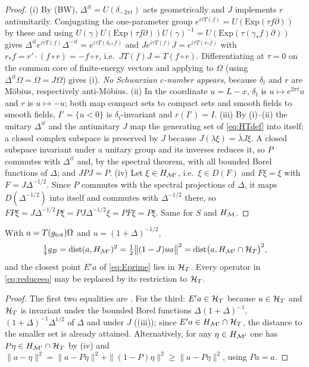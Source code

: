 \begin{proof}
(i) By (BW), $\Delta^{it}=U(\delta_{-2\pi t})$ acts geometrically and $J$ implements $r$ antiunitarily.
Conjugating the one-parameter group $e^{i\tau T(f)}=U(\mathrm{Exp}(\tau f\partial))$ by these and using
$U(\gamma)U(\mathrm{Exp}(\tau f\partial))U(\gamma)^{-1}=U(\mathrm{Exp}(\tau(\gamma_{*}f)\partial))$ gives
$\Delta^{it}e^{i\tau T(f)}\Delta^{-it}=e^{i\tau T(\delta_{t*}f)}$ and
$Je^{i\tau T(f)}J=e^{i\tau T(r_{*}f)}$ with $r_{*}f=r'\cdot(f\circ r)=-f\circ r$, i.e.\
$JT(f)J=T(f\circ r)$.  Differentiating at $\tau=0$ on the common core of finite-energy vectors and applying
to $\Omega$ (using $\Delta^{it}\Omega=\Omega=J\Omega$) gives (i).  \emph{No Schwarzian $c$-number appears},
because $\delta_{t}$ and $r$ are M\"obius, respectively anti-M\"obius.
(ii) In the coordinate $u=L-x$, $\delta_{t}$ is $u\mapsto e^{2\pi t}u$ and $r$ is $u\mapsto-u$; both map
compact sets to compact sets and smooth fields to smooth fields, $I'=\{u<0\}$ is $\delta_{t}$-invariant and
$r(I')=I$.
(iii) By (i)--(ii) the unitary $\Delta^{it}$ and the antiunitary $J$ map the generating set of \eqref{eq:HTdef}
into itself; a closed complex subspace is preserved by $J$ because $J(\lambda\xi)=\bar\lambda J\xi$.  A
closed subspace invariant under a unitary group and its inverses reduces it, so $P$ commutes with
$\Delta^{it}$ and, by the spectral theorem, with all bounded Borel functions of $\Delta$; and $JPJ=P$.
(iv) Let $\xi\in H_{\mathcal M'}$, i.e.\ $\xi\in D(F)$ and $F\xi=\xi$ with $F=J\Delta^{-1/2}$.  Since $P$ commutes
with the spectral projections of $\Delta$, it maps $D(\Delta^{-1/2})$ into itself and commutes with
$\Delta^{-1/2}$ there, so $FP\xi=J\Delta^{-1/2}P\xi=PJ\Delta^{-1/2}\xi=PF\xi=P\xi$.  Same for $S$ and
$H_{\mathcal M}$.
\end{proof}

\begin{proposition}\label{prop:reduce}
With $a=T(g_{\rm tot})\Omega$ and $u=(1+\Delta)^{-1/2}$,
\begin{equation}\label{eq:reduceeq}
 \tfrac14g_{B}=\operatorname{dist}(a,H_{\mathcal M'})^{2}=\tfrac12\bigl\|(1-J)ua\bigr\|^{2}
 =\operatorname{dist}\bigl(a,H_{\mathcal M'}\cap\mathcal H_T\bigr)^{2},
\end{equation}
and the closest point $E'a$ of \eqref{eq:Eprime} lies in $\mathcal H_T$.  Every operator in \eqref{eq:reduceeq} may
be replaced by its restriction to $\mathcal H_T$.
\end{proposition}

\begin{proof}
The first two equalities are .  For the third: $E'a\in\mathcal H_T$ because $a\in\mathcal H_T$ and $\mathcal H_T$ is
invariant under the bounded Borel functions $\Delta(1+\Delta)^{-1}$, $(1+\Delta)^{-1}\Delta^{1/2}$ of
$\Delta$ and under $J$ (\Cref{lem:reduce}(iii)); since $E'a\in H_{\mathcal M'}\cap\mathcal H_T$, the distance to the smaller
set is already attained.  Alternatively, for any $\eta\in H_{\mathcal M'}$ one has $P\eta\in H_{\mathcal M'}\cap\mathcal H_T$ by
\Cref{lem:reduce}(iv) and $\|a-\eta\|^{2}=\|a-P\eta\|^{2}+\|(1-P)\eta\|^{2}\ge\|a-P\eta\|^{2}$, using
$Pa=a$.
\end{proof}

